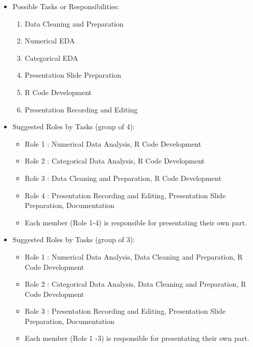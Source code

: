 \documentclass[12pt]{article}
\begin{document}
\begin{itemize}
\begin{enumerate}
        \item Project Proposal Submission (Deliverble1) - Due Next Tuesday at 10pm : Week 1
        \item Data Collection and Cleaning - Week 1-2
        \item Numerical EDA - Week 1-2
        \item Categorical EDA - Week 1-2
        \item Draft Presentation slide (Deliverble2) - Week 2
        \item R code submission (Deliverble2) - Week 2
        \item Record presentation - Week 3
        \item Recorded Presentation Submission - Week 4
    \end{enumerate}
     \item Possible Tasks or Responsibilities:
    \begin{enumerate}
        \item Data Cleaning and Preparation
        \item Numerical EDA
        \item Categorical EDA
        \item Presentation Slide Preparation
        \item R Code Development
        \item Presentation Recording and Editing
    \end{enumerate}
    \item Suggested Roles by Tasks (group of 4):
    \begin{itemize}
        \item Role 1 : Numerical Data Analysis, R Code Development 
        \item Role 2 : Categorical Data Analysis, R Code Development 
        \item Role 3 : Data Cleaning and Preparation, R Code Development 
        \item Role 4 : Presentation Recording and Editing, Presentation Slide Preparation, Documentation
        \item Each member (Role 1-4) is responsible for presentating their own part. 
    \end{itemize}
    \item Suggested Roles by Tasks (group of 3):
    \begin{itemize}
        \item Role 1 : Numerical Data Analysis, Data Cleaning and Preparation, R Code Development 
        \item Role 2 : Categorical Data Analysis, Data Cleaning and Preparation, R Code Development 
        \item Role 3 : Presentation Recording and Editing, Presentation Slide Preparation, Documentation   
        \item Each member (Role 1 -3) is responsible for presentating their own part. 
    \end{itemize}
\end{itemize}
\end{document}
